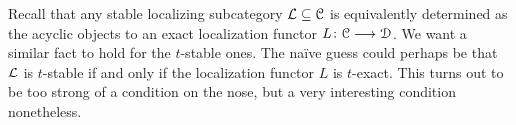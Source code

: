 




Recall that any stable localizing subcategory $\mathcal{L}\subseteq \EuScript{C}$ is equivalently determined as the acyclic objects to an exact localization functor $L\colon\EuScript{C}\longrightarrow\EuScript{D}$. We want a similar fact to hold for the $t$-stable ones. The naïve guess could perhaps be that $\mathcal{L}$ is $t$-stable if and only if the localization functor $L$ is $t$-exact. This turns out to be too strong of a condition on the nose, but a  very interesting condition nonetheless. 

